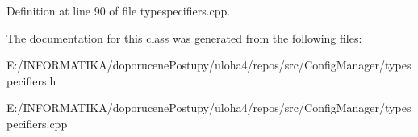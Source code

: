 Definition at line 90 of file typespecifiers.\+cpp.



The documentation for this class was generated from the following files\+:\begin{DoxyCompactItemize}
\item 
E\+:/\+I\+N\+F\+O\+R\+M\+A\+T\+I\+K\+A/doporucene\+Postupy/uloha4/repos/src/\+Config\+Manager/typespecifiers.\+h\item 
E\+:/\+I\+N\+F\+O\+R\+M\+A\+T\+I\+K\+A/doporucene\+Postupy/uloha4/repos/src/\+Config\+Manager/typespecifiers.\+cpp\end{DoxyCompactItemize}
